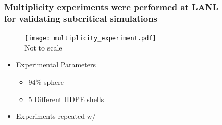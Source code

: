 \begin{frame}
\frametitle{Multiplicity experiments were performed at LANL \\ for validating subcritical
simulations}
\begin{minipage}{0.4\linewidth}
    \hspace{-0.3in}
\begin{figure}[h]
\begin{center}
    \texttt{[image: multiplicity\_experiment.pdf]} \\
    {\fontsize{7pt}{6pt}\selectfont  *Not to scale}
\end{center}
\end{figure}
\end{minipage}
\begin{minipage}{0.54\linewidth}
    {\addtolength\leftmargini{-0.5in}
     \addtolength\leftmarginii{-0.2in}
     \addtolength\wideitemsep{0.1in}
\begin{itemize}
    \item[] Experimental Parameters
  \begin{itemize}
      \item 94\%  sphere \vspace{-0.2in}
      \item 5 Different HDPE shells \\ 
  \end{itemize}
  \item[] Experiments repeated w/ 
\end{itemize} 
}
\end{minipage}

\end{frame} 


